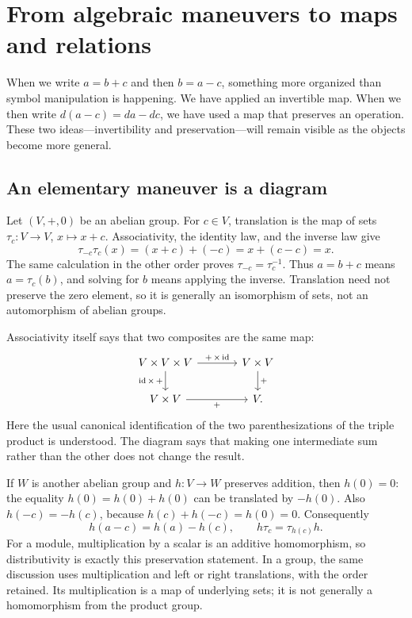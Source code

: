 \section{From algebraic maneuvers to maps and relations}
\label{f:begin}

When we write $a=b+c$ and then $b=a-c$, something more organized than
symbol manipulation is happening. We have applied an invertible map. When
we then write $d(a-c)=da-dc$, we have used a map that preserves an
operation. These two ideas---invertibility and preservation---will remain
visible as the objects become more general.

\subsection{An elementary maneuver is a diagram}

Let $(V,+,0)$ be an abelian group. For $c\in V$, translation is the map of
sets $\tau_c:V\to V$, $x\mapsto x+c$. Associativity, the identity law,
and the inverse law give
\[
\tau_{-c}\tau_c(x)=(x+c)+(-c)=x+(c-c)=x.
\]
The same calculation in the other order proves
$\tau_{-c}=\tau_c^{-1}$. Thus $a=b+c$ means $a=\tau_c(b)$, and solving
for $b$ means applying the inverse. Translation need not preserve the
zero element, so it is generally an isomorphism of sets, not an
automorphism of abelian groups.

Associativity itself says that two composites are the same map:
\[
\begin{tikzcd}[column sep=large]
V\times V\times V \arrow[r,"+\,\times\,\id"]
  \arrow[d,"\id\,\times\,+"'] & V\times V \arrow[d,"+"]\\
V\times V \arrow[r,"+"'] & V.
\end{tikzcd}
\]
Here the usual canonical identification of the two parenthesizations of
the triple product is understood. The diagram says that making one
intermediate sum rather than the other does not change the result.

If $W$ is another abelian group and $h:V\to W$ preserves addition,
then $h(0)=0$: the equality
$h(0)=h(0)+h(0)$ can be translated by $-h(0)$. Also
$h(-c)=-h(c)$, because $h(c)+h(-c)=h(0)=0$. Consequently
\[
h(a-c)=h(a)-h(c),\qquad h\tau_c=\tau_{h(c)}h.
\]
For a module, multiplication by a scalar is an additive homomorphism,
so distributivity is exactly this preservation statement. In a group,
the same discussion uses multiplication and left or right translations,
with the order retained. Its multiplication is a map of underlying
sets; it is not generally a homomorphism from the product group.

